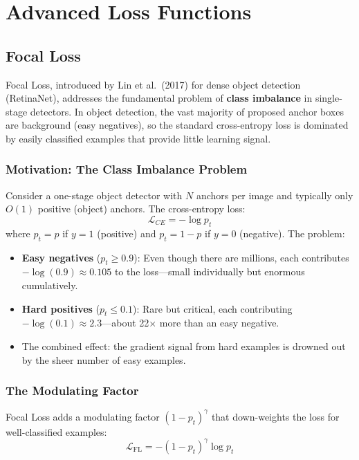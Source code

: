 \section{Advanced Loss Functions}

\subsection{Focal Loss}

Focal Loss, introduced by Lin et al.\ (2017) \cite{lin2017focal} for dense object detection (RetinaNet), addresses the fundamental problem of \textbf{class imbalance} in single-stage detectors. In object detection, the vast majority of proposed anchor boxes are background (easy negatives), so the standard cross-entropy loss is dominated by easily classified examples that provide little learning signal.

\subsubsection{Motivation: The Class Imbalance Problem}

Consider a one-stage object detector with $N$ anchors per image and typically only $O(1)$ positive (object) anchors. The cross-entropy loss:
\begin{equation}
\mathcal{L}_{CE} = -\log p_t
\end{equation}
where $p_t = p$ if $y = 1$ (positive) and $p_t = 1 - p$ if $y = 0$ (negative). The problem:
\begin{itemize}
    \item \textbf{Easy negatives} ($p_t \geq 0.9$): Even though there are millions, each contributes $-\log(0.9) \approx 0.105$ to the loss---small individually but enormous cumulatively.
    \item \textbf{Hard positives} ($p_t \leq 0.1$): Rare but critical, each contributing $-\log(0.1) \approx 2.3$---about 22$\times$ more than an easy negative.
    \item The combined effect: the gradient signal from hard examples is drowned out by the sheer number of easy examples.
\end{itemize}

\subsubsection{The Modulating Factor}

Focal Loss adds a modulating factor $(1 - p_t)^\gamma$ that down-weights the loss for well-classified examples:
\begin{equation}
\mathcal{L}_{\text{FL}} = -(1 - p_t)^\gamma \log p_t
\end{equation}

